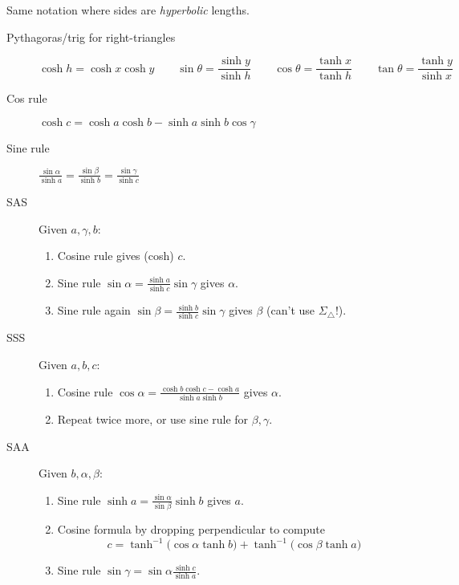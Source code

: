 \clearpage


Same notation where sides are \emph{hyperbolic} lengths. 

\begin{description}
	\item[Pythagoras/trig for right-triangles]
	\[\cosh h=\cosh x\cosh y\qquad\sin\theta=\frac{\sinh y}{\sinh h}\qquad \cos\theta=\frac{\tanh x}{\tanh h}\qquad \tan\theta=\frac{\tanh y}{\sinh x}\]
	
	\item[Cos rule] $\cosh c=\cosh a\cosh b-\sinh a\sinh b\cos\gamma$
	
	\item[Sine rule] $\frac{\sin\alpha}{\sinh a} =\frac{\sin\beta}{\sinh b} =\frac{\sin\gamma}{\sinh c}$
	
	\goodbreak
	
	\item[SAS] Given $a,\gamma,b$:
	\begin{enumerate}
	  \item Cosine rule gives (cosh) $c$.
	  \item Sine rule $\sin\alpha=\frac{\sinh a}{\sinh c}\sin\gamma$ gives $\alpha$.
	  \item Sine rule again $\sin\beta=\frac{\sinh b}{\sinh c}\sin\gamma$ gives $\beta$ (can't use $\Sigma_\triangle$!).
	\end{enumerate}
	
	\item[SSS] Given $a,b,c$:
	\begin{enumerate}
	  \item Cosine rule $\cos\alpha=\frac{\cosh b\cosh c-\cosh a}{\sinh a\sinh b}$ gives $\alpha$.
	  \item Repeat twice more, or use sine rule for $\beta,\gamma$.
	\end{enumerate}
	
	\item[SAA] Given $b,\alpha,\beta$:
	\begin{enumerate}
	  \item Sine rule $\sinh a=\frac{\sin\alpha}{\sin\beta}\sinh b$ gives $a$.
	  \item Cosine formula by dropping perpendicular to compute
	  \[c=\tanh^{-1}\bigl(\cos\alpha\tanh b\bigr) + \tanh^{-1}\bigl(\cos\beta\tanh a\bigr)\]
	  \item Sine rule $\sin\gamma=\sin\alpha\frac{\sinh c}{\sinh a}$.
	\end{enumerate}
	

\end{description}
